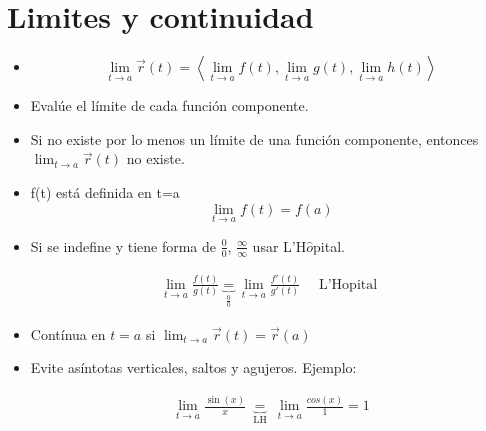 \section{Limites y continuidad}
\begin{itemize}
    \item \[
        \lim_{t \to a}\vec{r}(t) = \left\langle \lim_{t \to a} f(t),\lim_{t \to a} g(t),\lim_{t \to a} h(t) \right\rangle 
      \]
    
    \item Evalúe el límite de cada función componente.
    \item Si no existe por lo menos un límite de una función componente, entonces $\lim_{t \to a} \vec{r}(t) $ no existe.
    \item f(t) está definida en t=a
    \[
      \lim_{t \to a} f(t) = f(a)
    \]
    
    \item Si se indefine y tiene forma de $\frac{0}{0} $, $\frac{\infty}{\infty} $ usar L'H$\hat{o}$pital.
        \begin{center}
            \begin{align*}
                \lim_{t \to a} \frac{f(t)}{g(t)} \underbrace{=}_{\frac{0}{0} } \lim_{t \to a} \frac{f'(t)}{g'(t)} \quad \text{  L'Hopital  }
            \end{align*}
        \end{center}
    
    \item Contínua en $t=a$ si $\lim_{t \to a} \vec{r}(t)=\vec{r}(a)$
    \item Evite asíntotas verticales, saltos y agujeros. Ejemplo: 
        \begin{center}
            \begin{align*} 
                \lim_{t \to a} \frac{\sin(x)}{x} \underbrace{=}_{\text{  LH  }} \lim_{t \to a} \frac{cos(x)}{1} = 1 \\ 
            \end{align*}
        \end{center}
    
\end{itemize}



